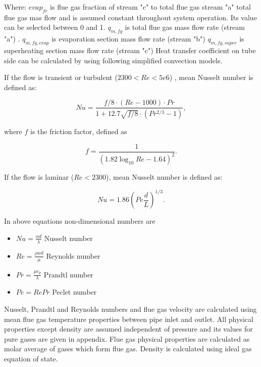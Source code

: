 \documentclass{article}
\begin{document}
	\noindent
	Where:
	$evap_{fr}$ is flue gas fraction of stream "c" to total flue gas stream "a"  total flue gas mas flow and is assumed constant throughout system operation. Its value can be selected between 0 and 1.
	$q_{m,fg}$ is total flue gas mass flow rate (stream "a") .
	$q_{m,fg,evap}$ is evaporation section mass flow rate (stream "b")
	$q_{m,fg,super}$ is superheating section mass flow rate (stream "c")
	Heat transfer coefficient on tube side can be calculated by using following simplified convection models.
	
	\noindent
	If the flow is transient or turbulent ($2300 < Re < 5e6$) , mean Nusselt number is defined as:
	
	\begin{equation}\label{eq:nusselt}
		Nu = \frac{f/8 \cdot (Re - 1000) \cdot Pr}{1+12.7\sqrt{f/8} \cdot (Pr^{2/3}-1)},
	\end{equation}
	
	\noindent
	where $f$ is the friction factor, defined as
	
	\begin{equation}\label{eq:fric_factor}
		f = \frac{1}{(1.82\log_{10}Re - 1.64)^2}.
	\end{equation}
	
	\noindent
	If the flow is laminar ($Re<2300$), mean Nusselt number is defined as:
	
	\begin{equation}\label{eq:nusselt2}
		Nu = 1.86 \left(Pe \frac{d}{L}\right)^{1/3}.
	\end{equation}
	
	\noindent
	In above equations non-dimensional numbers are
	
	\begin{itemize}
		\item $Nu = \frac{\alpha d}{\lambda}$ Nusselt number
		\item $Re = \frac{\rho w d}{\mu}$ Reynolds number
		\item $Pr = \frac{\mu c_p}{\lambda}$ Prandtl number
		\item $Pe = Re Pr$ Peclet number
	\end{itemize}

	\noindent
	Nusselt, Prandtl and Reynolds numbers and flue gas velocity are calculated using mean flue gas temperature properties between pipe inlet and outlet. All physical properties except density are assumed independent of pressure and its values for pure gases are given in appendix. Flue gas physical properties are calculated as molar average of gases which form flue gas. Density is calculated using ideal gas equation of state.
	
\end{document}
